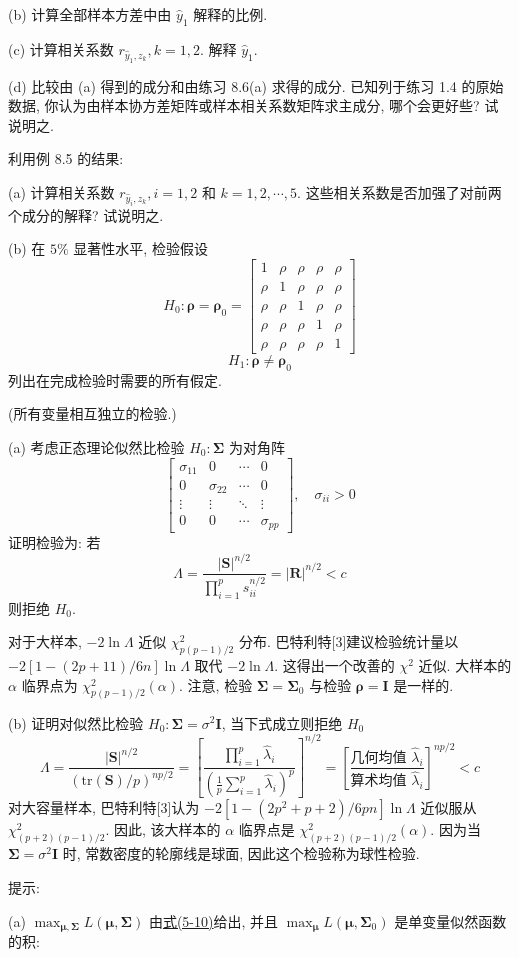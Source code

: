 
(b) 计算全部样本方差中由 $\hat{y}_1$ 解释的比例.

(c) 计算相关系数 $r_{\hat{y}_1,z_k},k=1,2$. 解释 $\hat{y}_1$.

(d) 比较由 (a) 得到的成分和由练习 8.6(a) 求得的成分. 已知列于练习 1.4 的原始数据, 你认为由样本协方差矩阵或样本相关系数矩阵求主成分, 哪个会更好些? 试说明之.

\quad 利用例 8.5 的结果:

(a) 计算相关系数 $r_{\hat{y}_i,z_k},i=1,2$ 和 $k=1,2,\cdots,5$. 这些相关系数是否加强了对前两个成分的解释? 试说明之.

(b) 在 $5\%$ 显著性水平, 检验假设
\[
H_0:\boldsymbol{\rho}=\boldsymbol{\rho}_0=\begin{bmatrix}1&\rho&\rho&\rho&\rho\\ \rho&1&\rho&\rho&\rho\\ \rho&\rho&1&\rho&\rho\\ \rho&\rho&\rho&1&\rho\\ \rho&\rho&\rho&\rho&1\end{bmatrix}
\]
\[
H_1:\boldsymbol{\rho}\neq\boldsymbol{\rho}_0
\]
列出在完成检验时需要的所有假定.

\quad (所有变量相互独立的检验.)

(a) 考虑正态理论似然比检验 $H_0:\boldsymbol{\Sigma}$ 为对角阵
\[
\begin{bmatrix}\sigma_{11}&0&\cdots&0\\ 0&\sigma_{22}&\cdots&0\\ \vdots&\vdots&\ddots&\vdots\\ 0&0&\cdots&\sigma_{pp}\end{bmatrix},\quad \sigma_{ii}>0
\]
证明检验为: 若
\[
\Lambda=\frac{|\mathbf{S}|^{n/2}}{\prod_{i=1}^{p}s_{ii}^{n/2}}=|\mathbf{R}|^{n/2}<c
\]
则拒绝 $H_0$.

对于大样本, $-2\ln\Lambda$ 近似 $\chi^2_{p(p-1)/2}$ 分布. 巴特利特[3]建议检验统计量以 $-2[1-(2p+11)/6n]\ln\Lambda$ 取代 $-2\ln\Lambda$. 这得出一个改善的 $\chi^2$ 近似. 大样本的 $\alpha$ 临界点为 $\chi^2_{p(p-1)/2}(\alpha)$. 注意, 检验 $\boldsymbol{\Sigma}=\boldsymbol{\Sigma}_0$ 与检验 $\boldsymbol{\rho}=\mathbf{I}$ 是一样的.

(b) 证明对似然比检验 $H_0:\boldsymbol{\Sigma}=\sigma^2\mathbf{I}$, 当下式成立则拒绝 $H_0$
\[
\Lambda=\frac{|\mathbf{S}|^{n/2}}{(\mathrm{tr}(\mathbf{S})/p)^{np/2}}=\left[\frac{\prod_{i=1}^{p}\hat{\lambda}_i}{\left(\frac{1}{p}\sum_{i=1}^{p}\hat{\lambda}_i\right)^p}\right]^{n/2}=\left[\frac{\text{几何均值 }\hat{\lambda}_i}{\text{算术均值 }\hat{\lambda}_i}\right]^{np/2}<c
\]
对大容量样本, 巴特利特[3]认为 $-2[1-(2p^2+p+2)/6pn]\ln\Lambda$ 近似服从 $\chi^2_{(p+2)(p-1)/2}$. 因此, 该大样本的 $\alpha$ 临界点是 $\chi^2_{(p+2)(p-1)/2}(\alpha)$. 因为当 $\boldsymbol{\Sigma}=\sigma^2\mathbf{I}$ 时, 常数密度的轮廓线是球面, 因此这个检验称为球性检验.

提示:

(a) $\max_{\boldsymbol{\mu},\boldsymbol{\Sigma}}L(\boldsymbol{\mu},\boldsymbol{\Sigma})$ 由\hyperref[eq:5-10]{式(5-10)}给出, 并且 $\max_{\boldsymbol{\mu}}L(\boldsymbol{\mu},\boldsymbol{\Sigma}_0)$ 是单变量似然函数的积:
